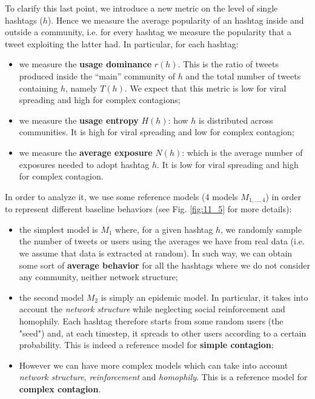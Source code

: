\documentclass[../main/main.tex]{subfiles}
\begin{document}
To clarify this last point, we introduce a new metric on the level of single hashtags (\( h \)). Hence we measure the average popularity of an hashtag inside and outside a community, i.e. for every hashtag we measure the popularity that a tweet exploiting the latter had. In particular, for each hashtag:
\begin{itemize}

\item we measure the \textbf{usage dominance} $r(h)$. This is the ratio of tweets produced inside the “main” community of $h$ and the total number of tweets containing $h$, namely $T(h)$. We expect that this metric is low for viral spreading and high for complex contagions;

\item we measure the \textbf{usage entropy} \( H(h) \): how \( h \) is distributed across communities. It is high for viral spreading and low for complex contagion;

\item we measure the \textbf{average exposure} $N(h)$: which is the average number of exposures needed to adopt hashtag $h$. It is low for viral spreading and high for complex contagion.

\end{itemize}

In order to analyze it, we use some reference models (4 models \( M_{1, \dots,4} \)) in order to represent different baseline behaviors (see Fig. \ref{fig:11_5} for more details):

\begin{itemize}
\item the simplest model is $M_1$ where, for a given hashtag \( h \), we randomly sample the number of tweets or users using the averages we have from real data (i.e. we assume that data is extracted at random). In such way, we can obtain some sort of \textbf{average behavior} for all the hashtags where we do not consider any community, neither network structure;

\item the second model $M_2$ is simply an epidemic model. In particular, it takes into account the \emph{network structure} while neglecting social reinforcement and homophily.  Each hashtag therefore starts from some random users (the "seed") and, at each timestep, it spreads to other users according to a certain probability. This is indeed a reference model for \textbf{simple contagion};

\item However we can have more complex models which can take into account \emph{network structure}, \emph{reinforcement} and \emph{homophily}. This is a reference model for \textbf{complex contagion}.
\end{itemize}
\end{document}
